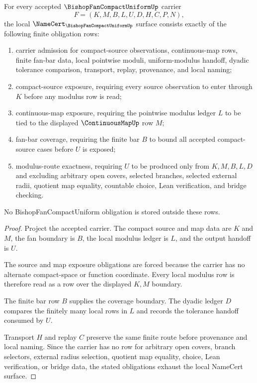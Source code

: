 \begin{theorem}\label{thm:compact-uniform-bishop-fan-namecert-obligations}
For every accepted $\BishopFanCompactUniformUp$ carrier
$$
F=(K,M,B,L,U,D,H,C,P,N),
$$
the local $\NameCert_{\BishopFanCompactUniformUp}$ surface consists exactly of the following finite obligation rows:
\begin{enumerate}
\item carrier admission for compact-source observations, continuous-map rows, finite fan-bar data, local pointwise moduli, uniform-modulus handoff, dyadic tolerance comparison, transport, replay, provenance, and local naming;
\item compact-source exposure, requiring every source observation to enter through $K$ before any modulus row is read;
\item continuous-map exposure, requiring the pointwise modulus ledger $L$ to be tied to the displayed $\ContinuousMapUp$ row $M$;
\item fan-bar coverage, requiring the finite bar $B$ to bound all accepted compact-source cases before $U$ is exposed;
\item modulus-route exactness, requiring $U$ to be produced only from $K,M,B,L,D$ and excluding arbitrary open covers, selected branches, selected external radii, quotient map equality, countable choice, Lean verification, and bridge checking.
\end{enumerate}
No BishopFanCompactUniform obligation is stored outside these rows.
\end{theorem}
\begin{proof}
Project the accepted carrier. The compact source and map data are $K$ and $M$, the fan boundary is $B$, the local modulus ledger is $L$, and the output handoff is $U$.

The source and map exposure obligations are forced because the carrier has no alternate compact-space or function coordinate. Every local modulus row is therefore read as a row over the displayed $K,M$ boundary.

The finite bar row $B$ supplies the coverage boundary. The dyadic ledger $D$ compares the finitely many local rows in $L$ and records the tolerance handoff consumed by $U$.

Transport $H$ and replay $C$ preserve the same finite route before provenance and local naming. Since the carrier has no row for arbitrary open covers, branch selectors, external radius selection, quotient map equality, choice, Lean verification, or bridge data, the stated obligations exhaust the local NameCert surface.
\end{proof}

